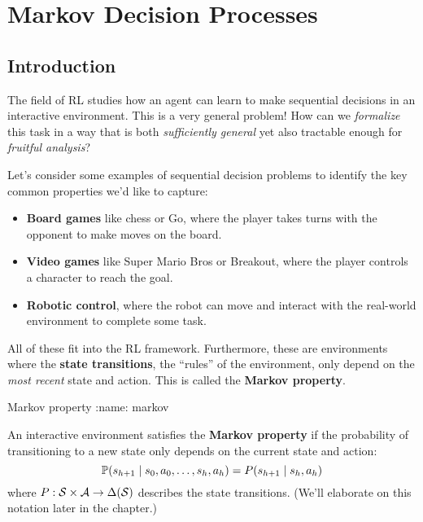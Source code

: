 \documentclass[\main/main]{subfiles}
\begin{document}
\chapter{Markov Decision Processes}
\label{ch:2_mdps}

\tableofcontents

\newpage
\section{Introduction}

The field of RL studies how an agent can learn to make sequential decisions in an interactive environment. This is a very general problem! How can we \emph{formalize} this task in a way that is both \emph{sufficiently general} yet also tractable enough for \emph{fruitful analysis}?

Let's consider some examples of sequential decision problems to identify the key common properties we'd like to capture:

\begin{itemize}
    \item \textbf{Board games} like chess or Go, where the player takes turns with the opponent to make moves on the board.
    \item \textbf{Video games} like Super Mario Bros or Breakout, where the player controls a character to reach the goal.
    \item \textbf{Robotic control}, where the robot can move and interact with the real-world environment to complete some task.
\end{itemize}



All of these fit into the RL framework. Furthermore, these are environments where the \textbf{state transitions}, the ``rules'' of the environment, only depend on the \emph{most recent} state and action. This is called the \textbf{Markov property}.

\begin{definition}{Markov property}
:name: markov

    An interactive environment satisfies the \textbf{Markov property} if the probability of transitioning to a new state only depends on the current state and action:
    \[
        \P(s_{h+1} \mid s_0, a_0, \dots, s_h, a_h) = P(s_{h+1} \mid s_h, a_h)
    \]
    where $P : \S \times \A \to \Delta(\S)$ describes the state transitions. (We'll elaborate on this notation later in the chapter.)
\end{definition}
\end{document}
